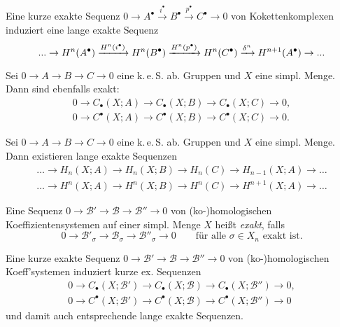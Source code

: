 \documentclass{cheat-sheet}
\newcommand{\CC}[1]{{#1}_{\bullet}} %
\newcommand{\CCC}[1]{{#1}^{\bullet}} %
\newcommand{\keS}{k.\,e.\,S.} %
\begin{document}

\begin{prop}
  Eine kurze exakte Sequenz
  $0 \to \CCC{A} \xrightarrow{i^\bullet} \CCC{B} \xrightarrow{p^\bullet} \CCC{C} \to 0$
  von Kokettenkomplexen induziert eine lange exakte Sequenz
  \[ \nldots \to H^n(\CCC{A}) \xrightarrow{H^n(i^\bullet)} H^n(\CCC{B}) \xrightarrow{H^n(p^\bullet)} H^n(\CCC{C}) \xrightarrow{\delta^n} H^{n+1}(\CCC{A}) \to \nldots \]
\end{prop}

\begin{lem}
  Sei $0 \to A \to B \to C \to 0$ eine \keS{} ab. Gruppen und $X$ eine simpl. Menge.
  Dann sind ebenfalls exakt:
  \begin{align*}
    0 \to \CC{C}(X; A) \to \CC{C}(X; B) \to \CC{C}(X; C) \to 0, \\
    0 \to \CCC{C}(X; A) \to \CCC{C}(X; B) \to \CCC{C}(X; C) \to 0.
  \end{align*}
\end{lem}

\begin{kor}
  Sei $0 \to A \to B \to C \to 0$ eine \keS{} ab. Gruppen und $X$ eine simpl. Menge. Dann existieren lange exakte Sequenzen
  \begin{align*}
    \ldots \to H_n(X; A) \to H_n(X; B) \to H_n(C) \to H_{n-1}(X; A) \to \ldots \\
    \ldots \to H^n(X; A) \to H^n(X; B) \to H^n(C) \to H^{n+1}(X; A) \to \ldots
  \end{align*}
\end{kor}



\begin{defn}
  Eine Sequenz $0 \to \mathcal{B}' \to \mathcal{B} \to \mathcal{B}'' \to 0$ von (ko-)homologischen Koeffizientensystemen auf einer simpl. Menge $X$ heißt \emph{exakt}, falls
  \[
    0 \to \mathcal{B}'_\sigma \to \mathcal{B}_\sigma \to \mathcal{B}''_\sigma \to 0 \qquad
    \text{für alle $\sigma \in X_n$ exakt ist.}
  \]
\end{defn}

\begin{lem}
  Eine kurze exakte Sequenz $0 \to \mathcal{B}' \to \mathcal{B} \to \mathcal{B}'' \to 0$ von (ko-)homologischen Koeff'systemen induziert kurze ex. Sequenzen
  \begin{align*}
    0 \to \CC{C}(X; \mathcal{B}') \to \CC{C}(X; \mathcal{B}) \to \CC{C}(X; \mathcal{B}'') \to 0, \\
    0 \to \CCC{C}(X; \mathcal{B}') \to \CCC{C}(X; \mathcal{B}) \to \CCC{C}(X; \mathcal{B}'') \to 0
  \end{align*}
  und damit auch entsprechende lange exakte Sequenzen.
\end{lem}
\end{document}
